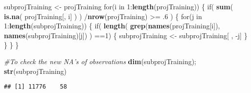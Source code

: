 \documentclass[]{article}
\newenvironment{Shaded}{\begin{snugshade}}{\end{snugshade}}
\newcommand{\KeywordTok}[1]{\textcolor[rgb]{0.13,0.29,0.53}{\textbf{{#1}}}}
\newcommand{\DecValTok}[1]{\textcolor[rgb]{0.00,0.00,0.81}{{#1}}}
\newcommand{\StringTok}[1]{\textcolor[rgb]{0.31,0.60,0.02}{{#1}}}
\newcommand{\CommentTok}[1]{\textcolor[rgb]{0.56,0.35,0.01}{\textit{{#1}}}}
\newcommand{\NormalTok}[1]{{#1}}
\begin{document}
\begin{Shaded}
\begin{Highlighting}[]
\NormalTok{subprojTraining <-}\StringTok{ }\NormalTok{projTraining }
\NormalTok{for(i in }\DecValTok{1}\NormalTok{:}\KeywordTok{length}\NormalTok{(projTraining)) \{ }
  \NormalTok{if( }\KeywordTok{sum}\NormalTok{( }\KeywordTok{is.na}\NormalTok{( projTraining[, i] ) ) /}\KeywordTok{nrow}\NormalTok{(projTraining) >=}\StringTok{ }\NormalTok{.}\DecValTok{6} \NormalTok{) \{ }
    \NormalTok{for(j in }\DecValTok{1}\NormalTok{:}\KeywordTok{length}\NormalTok{(subprojTraining)) \{}
      \NormalTok{if( }\KeywordTok{length}\NormalTok{( }\KeywordTok{grep}\NormalTok{(}\KeywordTok{names}\NormalTok{(projTraining[i]), }\KeywordTok{names}\NormalTok{(subprojTraining)[j]) ) ==}\DecValTok{1}\NormalTok{)  \{ }
        \NormalTok{subprojTraining <-}\StringTok{ }\NormalTok{subprojTraining[ , -j] }
      \NormalTok{\}   }
    \NormalTok{\} }
  \NormalTok{\}}
\NormalTok{\}}

\CommentTok{#To check the new NA's of observations}
\KeywordTok{dim}\NormalTok{(subprojTraining); }\KeywordTok{str}\NormalTok{(subprojTraining)}
\end{Highlighting}
\end{Shaded}

\begin{verbatim}
## [1] 11776    58
\end{verbatim}
\end{document}
